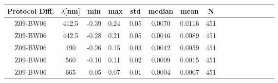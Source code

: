 \documentclass[preview]{standalone}
\begin{document}
\footnotesize
\centering
\setlength\tabcolsep{3pt} %
\begin{table}
\begin{tabular}{@{\extracolsep{4pt}}ScSlScScScScScSc @{}}
\hline
Protocol Diff. & $\lambda$[nm] & min & max & std & median & mean  & N\\ \hline
Z09-BW06 & 412.5 & -0.39 & 0.24 & 0.05 & 0.0070 & 0.0116 & 451\\
Z09-BW06 & 442.5 & -0.28 & 0.21 & 0.05 & 0.0046 & 0.0089 & 451\\
Z09-BW06 & 490   & -0.26 & 0.15 & 0.03 & 0.0042 & 0.0059 & 451\\
Z09-BW06 & 560   & -0.10 & 0.11 & 0.02 & 0.0009 & 0.0015 & 451\\
Z09-BW06 & 665   & -0.05 & 0.07 & 0.01 & 0.0004 & 0.0007 & 451\\\hline


\end{tabular}
\end{table}
\end{document}
